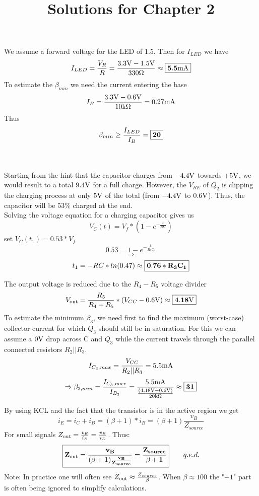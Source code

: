 \documentclass{article}
\begin{document}
\title{Solutions for Chapter 2}

	We assume a forward voltage for the LED of 1.5\V. Then for $I_{LED}$ we have
	\[I_{LED} = \frac{V_R}{R} = \frac{3.3\text{V} - 1.5\text{V}}{330\Omega} \approx \boxed{\mathbf{5.5\text{m}\text{A}}}\]
	To estimate the $\beta_{min}$ we need the current entering the base
	\[I_B = \frac{3.3\text{V} - 0.6\text{V}}{10\text{k}\Omega} = 0.27\text{m}\text{A} \]
	Thus
	\[\beta_{min} \geq \frac{I_{LED}}{I_B} = \boxed{\mathbf{20}}\]
	
	
	\\\\
	Starting from the hint that the capacitor charges from $-4.4\text{V}$ towards $+5\text{V}$, we would result to a total $9.4\text{V}$ for a full charge. However, the $V_{BE}$ of $Q_2$ is clipping the charging process at only $5\text{V}$ of the total (from $-4.4\text{V}$ to $0.6\text{V}$). Thus, the capacitor will be $53\%$ charged at the end. \\Solving the voltage equation for a charging capacitor gives us
	\[V_C(t) = V_f * (1 - e^{-\frac{t}{R C}})\]
	set $V_C(t_1) = 0.53 * V_f$
	\[0.53 = 1 - e^{-\frac{t_1}{R_3 C_1}}\]
	\[\Rightarrow\]
	\[t_1 = - R C*ln(0.47) \approx \boxed{\mathbf{0.76 * R_3 C_1}}\]
	
	
	The output voltage is reduced due to the $R_4 - R_5$ voltage divider
	\[V_{\text{out}} = \frac{R_5}{R_4 + R_5} * (V_{CC} - 0.6\text{V}) \approx \boxed{\mathbf{4.18\text{V}}}\]
	To estimate the minimum $\beta_3$, we need first to find the maximum (worst-case) collector current for which $Q_3$ should still be in saturation. For this we can assume a $0\text{V}$ drop across C and $Q_3$ while the current travels through the parallel connected resistors $R_2||R_3$.
	\[I_{C_3,max} = \frac{V_{CC}}{R_2||R_3} = 5.5\text{m}\text{A}\]
	\[\Rightarrow \beta_{3,min} = \frac{I_{C_3,max}}{I_{B_3}} = \frac{5.5\text{m}\text{A}}{\frac{(4.18\text{V} - 0.6\text{V})} {20\text{k}\Omega}} \approx \boxed{\mathbf{31}}\]
	
	
	By using KCL and the fact that the transistor is in the active region we get
	\[i_E = i_C + i_B = (\beta + 1) * i_B = (\beta + 1) \frac{v_B}{Z_{source}}\]
	For small signals $Z_{\text{out}} = \frac{v_E}{i_E} = \frac{v_B}{i_E}$. Thus:
	\[ \boxed{\mathbf{Z_{\text{out}} = \frac{v_B}{(\beta + 1)\frac{v_B}{Z_{source}}} = \frac{Z_{source}}{\beta +1}}}\qquad q.e.d.\]
	Note: In practice one will often see $Z_{\text{out}} \approx \frac{Z_{source}}{\beta}$. When $\beta \approx 100$ the "$+ 1$" part is often being ignored to simplify calculations.
\end{document}
